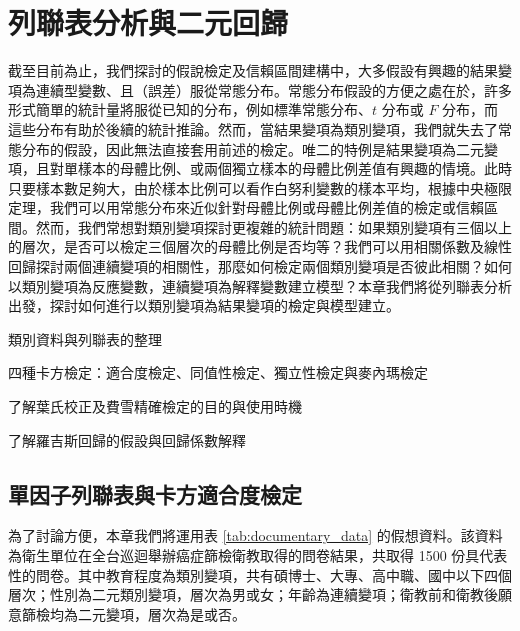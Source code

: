 \chapter{列聯表分析與二元回歸}

    截至目前為止，我們探討的假說檢定及信賴區間建構中，大多假設有興趣的結果變項為連續型變數、且（誤差）服從常態分布。常態分布假設的方便之處在於，許多形式簡單的統計量將服從已知的分布，例如標準常態分布、$t$ 分布或 $F$ 分布，而這些分布有助於後續的統計推論。然而，當結果變項為類別變項，我們就失去了常態分布的假設，因此無法直接套用前述的檢定。唯二的特例是結果變項為二元變項，且對單樣本的母體比例、或兩個獨立樣本的母體比例差值有興趣的情境。此時只要樣本數足夠大，由於樣本比例可以看作白努利變數的樣本平均，根據中央極限定理，我們可以用常態分布來近似針對母體比例或母體比例差值的檢定或信賴區間。然而，我們常想對類別變項探討更複雜的統計問題：如果類別變項有三個以上的層次，是否可以檢定三個層次的母體比例是否均等？我們可以用相關係數及線性回歸探討兩個連續變項的相關性，那麼如何檢定兩個類別變項是否彼此相關？如何以類別變項為反應變數，連續變項為解釋變數建立模型？本章我們將從列聯表分析出發，探討如何進行以類別變項為結果變項的檢定與模型建立。
    
    \begin{introduction}
        \item 類別資料與列聯表的整理
        \item 四種卡方檢定：適合度檢定、同值性檢定、獨立性檢定與麥內瑪檢定
        \item 了解葉氏校正及費雪精確檢定的目的與使用時機
        \item 了解羅吉斯回歸的假設與回歸係數解釋
    \end{introduction}

\section{單因子列聯表與卡方適合度檢定}

    為了討論方便，本章我們將運用表 \ref{tab:documentary_data} 的假想資料。該資料為衛生單位在全台巡迴舉辦癌症篩檢衛教取得的問卷結果，共取得 1500 份具代表性的問卷。其中教育程度為類別變項，共有碩博士、大專、高中職、國中以下四個層次；性別為二元類別變項，層次為男或女；年齡為連續變項；衛教前和衛教後願意篩檢均為二元變項，層次為是或否。
    
